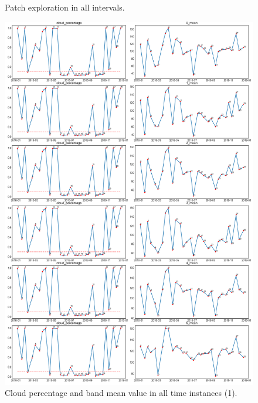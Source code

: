 \documentclass[../main.tex]{subfiles}
\begin{document}
\begin{appendices}
\begin{figure}[H]
	\caption{Patch exploration in all intervals.}
	\label{fig:eda-merge-patch-xploration}
\end{figure}
\begin{figure}[H]
	\centering
	\enlargethispage{5cm}
	\includegraphics[width=15cm]{imgs/eda/merge/cloud-percentage-each-time-interval-band-1}
	\caption{Cloud percentage and band mean value in all time instances (1).}
	\label{fig:eda-merge-patch-xploration-band-1}
\end{figure}
\begin{figure}[H]
	\centering
	\enlargethispage{5cm}

\end{figure}
\end{appendices}
\end{document}
